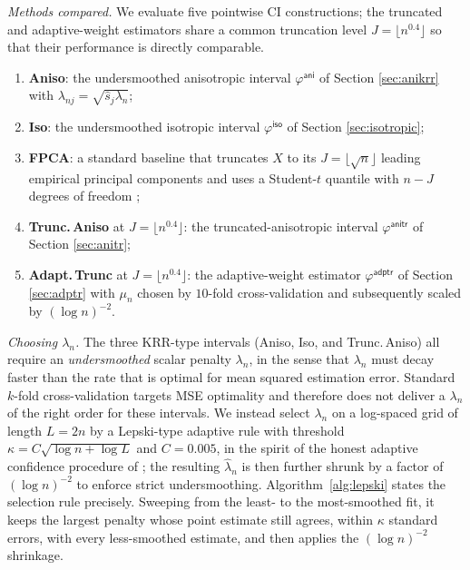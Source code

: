 \documentclass[aos]{imsart}
\renewcommand{\hat}{\widehat}
\newcommand{\iso}{\mathsf{iso}}
\newcommand{\ani}{\mathsf{ani}}
\newcommand{\anitr}{\mathsf{anitr}}
\newcommand{\adptr}{\mathsf{adptr}}
\theoremstyle{plain}
\theoremstyle{definition}
\theoremstyle{definition}
\begin{document}
\medskip\noindent\textit{Methods compared.}
We evaluate five pointwise CI constructions; the truncated and adaptive-weight estimators share a common truncation level $J=\lfloor n^{0.4}\rfloor$ so that their performance is directly comparable.
\begin{enumerate}[label=(\roman*),leftmargin=2.2em]
\item \textbf{Aniso}: the undersmoothed anisotropic interval $\varphi^{\ani}$ of Section \ref{sec:anikrr} with $\lambda_{nj}=\sqrt{\hat s_j\lambda_n}$;
\item \textbf{Iso}: the undersmoothed isotropic interval $\varphi^{\iso}$ of Section \ref{sec:isotropic};
\item \textbf{FPCA}: a standard baseline that truncates $X$ to its $J=\lfloor\sqrt n\rfloor$ leading empirical principal components and uses a Student-$t$ quantile with $n-J$ degrees of freedom \citep{cai2006prediction};
\item \textbf{Trunc.\,Aniso} at $J=\lfloor n^{0.4}\rfloor$: the truncated-anisotropic interval $\varphi^{\anitr}$ of Section \ref{sec:anitr};
\item \textbf{Adapt.\,Trunc} at $J=\lfloor n^{0.4}\rfloor$: the adaptive-weight estimator $\varphi^{\adptr}$ of Section \ref{sec:adptr} with $\mu_n$ chosen by $10$-fold cross-validation and subsequently scaled by $(\log n)^{-2}$.
\end{enumerate}
\medskip\noindent\textit{Choosing $\lambda_n$.}
The three KRR-type intervals (Aniso, Iso, and Trunc.\,Aniso) all require an \emph{undersmoothed} scalar penalty $\lambda_n$, in the sense that $\lambda_n$ must decay faster than the rate that is optimal for mean squared estimation error. Standard $k$-fold cross-validation targets MSE optimality and therefore does not deliver a $\lambda_n$ of the right order for these intervals. We instead select $\lambda_n$ on a log-spaced grid of length $L=2n$ by a Lepski-type adaptive rule with threshold $\kappa=C\sqrt{\log n+\log L}$ and $C=0.005$, in the spirit of the honest adaptive confidence procedure of \citet{chernozhukov2014anticoncentration}; the resulting $\hat\lambda_n$ is then further shrunk by a factor of $(\log n)^{-2}$ to enforce strict undersmoothing.
Algorithm~\ref{alg:lepski} states the selection rule precisely. Sweeping from the least- to the most-smoothed fit, it keeps the largest penalty whose point estimate still agrees, within $\kappa$ standard errors, with every less-smoothed estimate, and then applies the $(\log n)^{-2}$ shrinkage.
\end{document}
